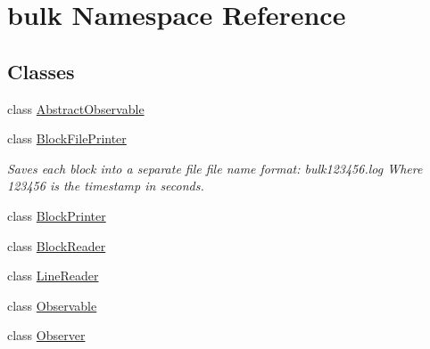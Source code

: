 \hypertarget{namespacebulk}{}\section{bulk Namespace Reference}
\label{namespacebulk}
\subsection*{Classes}
\begin{DoxyCompactItemize}
\item 
class \hyperlink{classbulk_1_1AbstractObservable}{Abstract\+Observable}
\item 
class \hyperlink{classbulk_1_1BlockFilePrinter}{Block\+File\+Printer}
\begin{DoxyCompactList}\small\item\em Saves each block into a separate file file name format\+: bulk123456.\+log Where 123456 is the timestamp in seconds. \end{DoxyCompactList}\item 
class \hyperlink{classbulk_1_1BlockPrinter}{Block\+Printer}
\item 
class \hyperlink{classbulk_1_1BlockReader}{Block\+Reader}
\item 
class \hyperlink{classbulk_1_1LineReader}{Line\+Reader}
\item 
class \hyperlink{classbulk_1_1Observable}{Observable}
\item 
class \hyperlink{classbulk_1_1Observer}{Observer}
\end{DoxyCompactItemize}
